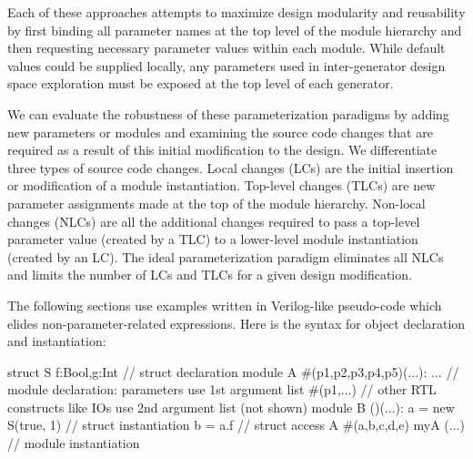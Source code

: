 Each of these approaches attempts to maximize design modularity and reusability by first binding all parameter names at the top level of the module hierarchy and then requesting necessary parameter values within each module. 
While default values could be supplied locally, any parameters used in inter-generator design space exploration must be exposed at the top level of each generator.



We can evaluate the robustness of these parameterization paradigms by adding new parameters or modules and examining the source code changes that are required as a result of this initial modification to the design.
We differentiate three types of source code changes.
Local changes (LCs) are the initial insertion or modification of a module instantiation. 
Top-level changes (TLCs) are new parameter assignments made at the top  of the module hierarchy. 
Non-local changes (NLCs) are all the additional changes required to pass a top-level parameter value (created by a TLC) to a lower-level module instantiation (created by an LC). 
The ideal parameterization paradigm eliminates all NLCs and limits the number of LCs and TLCs for a given design modification.

The following sections use examples written in Verilog-like pseudo-code which elides non-parameter-related expressions. Here is the syntax for object declaration and instantiation:

\begin{phdl}
struct S {f:Bool,g:Int}          // struct declaration
module A #(p1,p2,p3,p4,p5)(...): ... 
   // module declaration: parameters use 1st argument list #(p1,...)
   // other RTL constructs like IOs use 2nd argument list (not shown)
module B ()(...):
  a = new S(true, 1)             // struct instantiation
  b = a.f                        // struct access
  A #(a,b,c,d,e) myA (...)       // module instantiation
\end{phdl} 

